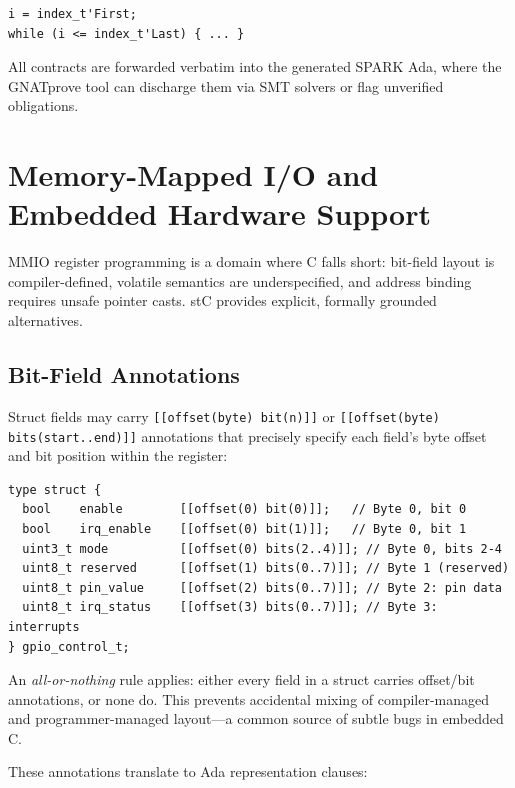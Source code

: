 \documentclass[runningheads]{llncs}
\begin{document}
\begin{lstlisting}
i = index_t'First;
while (i <= index_t'Last) { ... }
\end{lstlisting}

All contracts are forwarded verbatim into the generated SPARK Ada, where the
GNATprove tool can discharge them via SMT solvers or flag unverified
obligations.

\section{Memory-Mapped I/O and Embedded Hardware Support}
\label{sec:mmio}

MMIO register programming is a domain where C falls short: bit-field layout
is compiler-defined, volatile semantics are underspecified, and address binding
requires unsafe pointer casts. stC provides explicit, formally grounded alternatives.

\subsection{Bit-Field Annotations}

Struct fields may carry \texttt{[[offset(byte) bit(n)]]} or
\texttt{[[offset(byte) bits(start..end)]]} annotations that precisely specify
each field's byte offset and bit position within the register:

\begin{lstlisting}[caption={GPIO 32-bit control register with bit fields}]
type struct {
  bool    enable        [[offset(0) bit(0)]];   // Byte 0, bit 0
  bool    irq_enable    [[offset(0) bit(1)]];   // Byte 0, bit 1
  uint3_t mode          [[offset(0) bits(2..4)]]; // Byte 0, bits 2-4
  uint8_t reserved      [[offset(1) bits(0..7)]]; // Byte 1 (reserved)
  uint8_t pin_value     [[offset(2) bits(0..7)]]; // Byte 2: pin data
  uint8_t irq_status    [[offset(3) bits(0..7)]]; // Byte 3: interrupts
} gpio_control_t;
\end{lstlisting}

An \emph{all-or-nothing} rule applies: either every field in a struct carries
offset/bit annotations, or none do. This prevents accidental mixing of
compiler-managed and programmer-managed layout---a common source of subtle
bugs in embedded C.

These annotations translate to Ada representation clauses:
\end{document}

